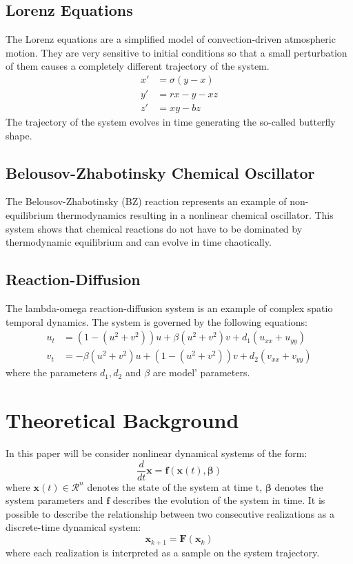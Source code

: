 \documentclass[]{article}
\begin{document}
\subsection{Lorenz Equations}
The Lorenz equations are a simplified model of convection-driven atmospheric motion. They are very sensitive to initial conditions so that a small perturbation of them causes a completely different trajectory of the system.
\begin{equation}
\begin{aligned}
x' &= \sigma (y - x) \\
y' &= rx -y - xz \\
z' &= xy -bz
\end{aligned}
\end{equation}
The trajectory of the system evolves in time generating the so-called butterfly shape.

\subsection{Belousov-Zhabotinsky Chemical Oscillator}
The Belousov-Zhabotinsky (BZ) reaction represents an example of non-equilibrium thermodynamics resulting in a nonlinear chemical oscillator. This system shows that chemical reactions do not have to be dominated by thermodynamic equilibrium and can evolve in time chaotically.

\subsection{Reaction-Diffusion}
The lambda-omega reaction-diffusion system is an example of complex spatio temporal dynamics. The system is governed by the following equations:
\begin{equation}
\begin{aligned}
u_t &= (1-(u^2 +v^2))u+ \beta (u^2 +v^2)v+d_1(u_{xx} +u_{yy}) \\
v_t &=  - \beta (u^2 +v^2)u+(1-(u^2 +v^2))v+d_2(v_{xx} +v_{yy})
\end{aligned}
\end{equation}
where the parameters $d_1, d_2$ and $\beta$ are model' parameters. 

\section{Theoretical Background}
In this paper will be consider nonlinear dynamical systems of the form:
\begin{equation}\label{dynsys1}
    \frac{d}{dt}\textbf{x} =\textbf{f}(\textbf{x}(t), \boldsymbol\beta)
\end{equation}
where $\textbf{x}(t) \in \mathcal{R}^n$ denotes the state of the system at time t, $\boldsymbol\beta$ denotes the system parameters and $\textbf{f}$ describes the evolution of the system in time. It is possible to describe the relationship between two consecutive realizations as a discrete-time dynamical system:
\begin{equation}\label{dynsys2}
    \textbf{x}_{k+1} =\textbf{F}(\textbf{x}_k)
\end{equation}
where each realization is interpreted as a sample on the system trajectory.
\end{document}
